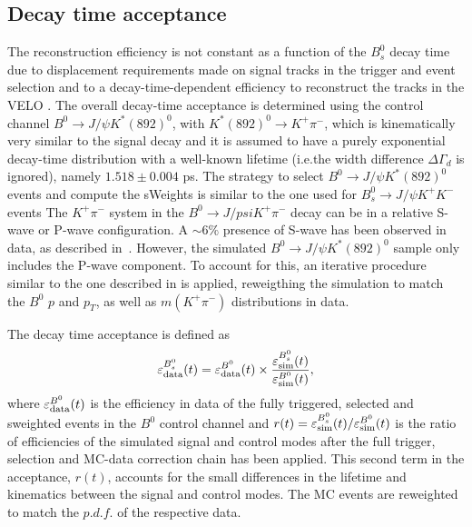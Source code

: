 \subsection{Decay time acceptance} 
\label{subsec:TimeAcc}
The reconstruction efficiency is not constant as a function of the $B^0_s$ decay time due to displacement requirements made on signal tracks in the trigger and event selection and to a decay-time-dependent efficiency to reconstruct the tracks in the VELO \cite{LHCb-PAPER-2013-065}. The overall decay-time acceptance is determined using the control channel $B^0 \to J/\psi K^{*}(892)^0$,
with $K^{*}(892)^0 \to K^+\pi^-$, which is kinematically very similar to the signal decay and it is assumed to have a purely exponential decay-time distribution with a well-known lifetime (i.e.the width difference $\Delta \Gamma_d$ is ignored), namely $1.518\pm 0.004$ ps\cite{HFLAV2017}.
The strategy to select $B^0 \to J/\psi K^{*}(892)^0$ events and compute the sWeights is similar to the one used for $B_s^0 \rightarrow J/\psi K^+ K^-$ events
The $K^+\pi^-$ system in the $B^0 \rightarrow J/psi K^+\pi^-$ decay can be in a relative S-wave or P-wave configuration. A $\sim6\%$ presence of S-wave has been observed in data, as described in~\cite{LHCb-PAPER-2013-023}. However, the simulated $B^0 \rightarrow J/\psi K^{*}(892)^0$ sample only includes the P-wave component. To account for this, an iterative procedure similar to the one described in \red{\ref{subsec:AngAcc}} is applied, reweigthing the simulation to match the $B^0$ $p$ and $p_T$, as well as $m(K^+\pi^-)$ distributions in data. %

The decay time acceptance is defined as
\begin{equation}
	\varepsilon_{\rm data}^{B_s^0}(t) = \varepsilon_{\rm data}^{B^0}(t) \times \frac{\varepsilon_{\rm sim}^{B_s^0}(t)}{\varepsilon_{\rm sim}^{B^0}(t)},
\label{eq:timeacc}
\end{equation}
where $\varepsilon_{\rm data}^{B^0}(t)$ is the efficiency in data of the fully triggered, selected and sweighted events in the $B^0$ control channel and $r(t)=\varepsilon_{\rm sim}^{B_s^0}(t)/\varepsilon_{\rm sim}^{B^0}(t)$ is the ratio of efficiencies of the
simulated signal and control modes after the full trigger, selection and MC-data correction chain has been applied.
This second term in the acceptance, $r(t)$, accounts for the small differences in the lifetime and kinematics between
the signal and control modes. The MC events are reweighted to match the $p.d.f.$ of the respective data. %

